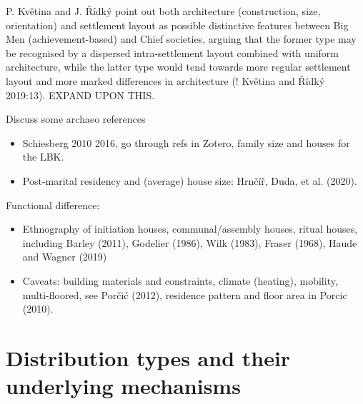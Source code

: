 \documentclass[
  12pt,
]{book}
\providecommand{\tightlist}{%
  \setlength{\itemsep}{0pt}\setlength{\parskip}{0pt}}
\begin{document}
P. Květina and J. Řídký point out both architecture (construction, size, orientation) and settlement layout as possible distinctive features between Big Men (achievement-based) and Chief societies, arguing that the former type may be recognised by a dispersed intra-settlement layout combined with uniform architecture, while the latter type would tend towards more regular settlement layout and more marked differences in architecture (! Květina and Řídký 2019:13). EXPAND UPON THIS.

Discuss some archaeo references

\begin{itemize}
\tightlist
\item
  Schiesberg 2010 2016, go through refs in Zotero, family size and houses for the LBK.
\item
  Post-marital residency and (average) house size: Hrnčíř, Duda, et al. (2020).
\end{itemize}

Functional difference:

\begin{itemize}
\item
  Ethnography of initiation houses, communal/assembly houses, ritual houses, including Barley (2011), Godelier (1986), Wilk (1983), Fraser (1968), Haude and Wagner (2019)
\item
  Caveats: building materials and constraints, climate (heating), mobility, multi-floored, see Porčić (2012), residence pattern and floor area in Porcic (2010).
\end{itemize}

\hypertarget{distributions}{%
\section{Distribution types and their underlying mechanisms}\label{distributions}}
\end{document}
